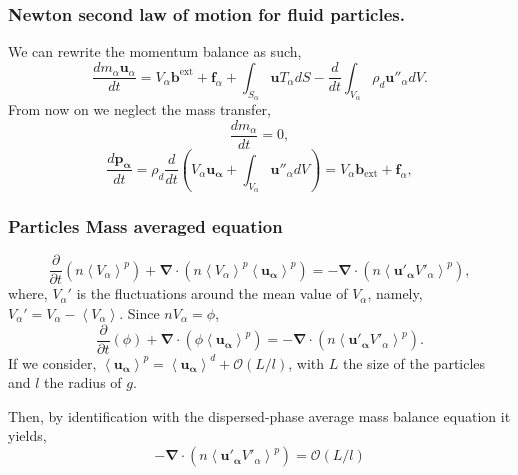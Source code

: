 \documentclass[aspectratio=169]{beamer}
\begin{document}
\begin{frame}
  \frametitle{Newton second law of motion for fluid particles.}
We can rewrite the momentum balance as such,
\begin{equation}
  \frac{d m_\alpha \bm{u}_{\alpha}}{dt} 
  = V_\alpha\bm{b}^{\text{ext}} 
  + \bm{f}_\alpha
  + \int_{S_\alpha} \bm{u} T_\alpha dS
  - \frac{d}{dt}  \int_{V_\alpha} \rho_d \bm{u''}_\alpha dV.
\end{equation}
From now on we neglect the mass transfer, 
\begin{equation}
  \label{eq:massdef}
  \frac{d m_\alpha}{dt} 
  = 0,
\end{equation}
\begin{equation}
  \label{eq:momentumdef}
  \frac{d \bm{p_\alpha}}{dt} 
  = \rho_d \frac{d}{dt} \left(V_\alpha \bm{u_\alpha} 
  + \int_{V_\alpha} \bm{u''}_\alpha dV\right)
  = V_\alpha\bm{b}_{\text{ext}} 
  + \bm{f}_\alpha,
\end{equation}
\end{frame}
\begin{frame}
  \frametitle{Particles Mass averaged equation}
  \begin{equation}
    \frac{\partial }{\partial t}(n\left<V_\alpha\right>^p) 
    + \bm{\nabla}\cdot(n\left<V_\alpha\right>^p\left<\bm{u_\alpha}\right>^p )
    = 
    - \bm{\nabla}\cdot(n\left<\bm{u'_\alpha}V'_\alpha\right>^p),
\end{equation}  
where, $V_\alpha'$ is the fluctuations around the mean value of $V_\alpha$,
namely, $V_\alpha' = V_\alpha - \left<V_\alpha\right>$.
Since $nV_\alpha = \phi$,
\begin{equation}
  \frac{\partial }{\partial t}(\phi) 
  + \bm{\nabla}\cdot(\phi\left<\bm{u_\alpha}\right>^p )
  = 
  - \bm{\nabla}\cdot(n\left<\bm{u'_\alpha}V'_\alpha\right>^p).
  \label{eq:massavg}
\end{equation}  
If we consider, $\left<\bm{u_\alpha}\right>^p =\left<\bm{u_\alpha}\right>^d + \mathcal{O}\left(L/l\right)$,
with $L$ the size of the particles and $l$ the radius of $g$. 

Then, by identification with the dispersed-phase average mass balance equation it yields,
\begin{equation}
  - \bm{\nabla}\cdot(n\left<\bm{u'_\alpha}V'_\alpha\right>^p) =  \mathcal{O}\left(L/l\right)
\end{equation}
\end{frame}
\end{document}
